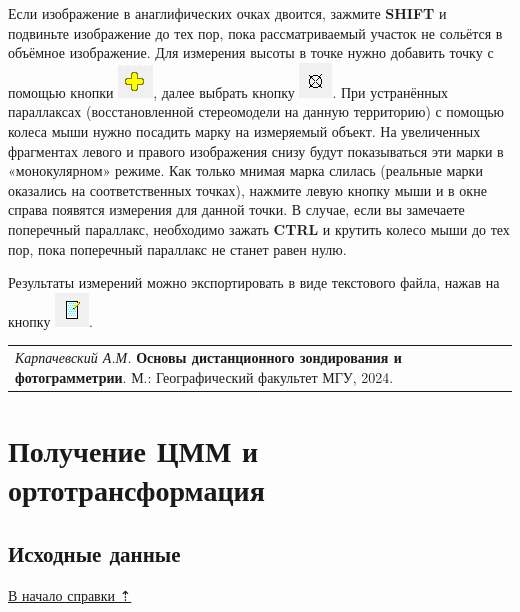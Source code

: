 \documentclass[
  12pt,
]{book}
\begin{document}
Если изображение в анаглифических очках двоится, зажмите \textbf{SHIFT} и подвиньте изображение до тех пор, пока рассматриваемый участок не сольётся в объёмное изображение. Для измерения высоты в точке нужно добавить точку с помощью кнопки \includegraphics{images/Ref13/Add_Point.png}, далее выбрать кнопку \includegraphics{images/Ref13/Measure.png}. При устранённых параллаксах (восстановленной стереомодели на данную территорию) с помощью колеса мыши нужно посадить марку на измеряемый объект. На увеличенных фрагментах левого и правого изображения снизу будут показываться эти марки в «монокулярном» режиме. Как только мнимая марка слилась (реальные марки оказались на соответственных точках), нажмите левую кнопку мыши и в окне справа появятся измерения для данной точки. В случае, если вы замечаете поперечный параллакс, необходимо зажать \textbf{CTRL} и крутить колесо мыши до тех пор, пока поперечный параллакс не станет равен нулю.

Результаты измерений можно экспортировать в виде текстового файла, нажав на кнопку \includegraphics{images/Ref13/Export.png}.

\begin{longtable}[]{@{}l@{}}
\toprule\noalign{}
\endhead
\bottomrule\noalign{}
\endlastfoot
\emph{Карпачевский А.М.} \textbf{Основы дистанционного зондирования и фотограмметрии}. М.: Географический факультет МГУ, 2024. \\
\end{longtable}

\hypertarget{dem}{%
\chapter{Получение ЦММ и ортотрансформация}\label{dem}}

\hypertarget{dem-initial}{%
\section{Исходные данные}\label{dem-initial}}

\protect\hyperlink{dem}{В начало справки ⇡}
\end{document}
